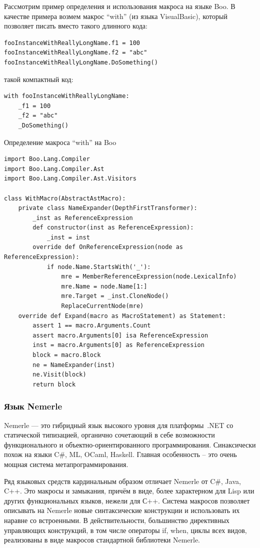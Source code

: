 \documentclass[a4paper,12pt]{article}
\begin{document}
Рассмотрим пример определения и использования макроса на языке Boo. В качестве
примера возмем макрос ``with'' (из языка VisualBasic), который позволяет писать
вместо такого длинного кода:
\begin{verbatim}
fooInstanceWithReallyLongName.f1 = 100
fooInstanceWithReallyLongName.f2 = "abc"
fooInstanceWithReallyLongName.DoSomething()
\end{verbatim}
такой компактный код:
\begin{verbatim}
with fooInstanceWithReallyLongName:
    _f1 = 100
    _f2 = "abc"
    _DoSomething()
\end{verbatim}

\begin{example}
Определение макроса ``with'' на Boo
\end{example}
\begin{verbatim}
import Boo.Lang.Compiler
import Boo.Lang.Compiler.Ast
import Boo.Lang.Compiler.Ast.Visitors

class WithMacro(AbstractAstMacro):
    private class NameExpander(DepthFirstTransformer):
        _inst as ReferenceExpression
        def constructor(inst as ReferenceExpression):
            _inst = inst
        override def OnReferenceExpression(node as ReferenceExpression):
            if node.Name.StartsWith('_'):
                mre = MemberReferenceExpression(node.LexicalInfo)
                mre.Name = node.Name[1:]
                mre.Target = _inst.CloneNode()
                ReplaceCurrentNode(mre)
    override def Expand(macro as MacroStatement) as Statement:
        assert 1 == macro.Arguments.Count
        assert macro.Arguments[0] isa ReferenceExpression
        inst = macro.Arguments[0] as ReferenceExpression
        block = macro.Block
        ne = NameExpander(inst)
        ne.Visit(block)
        return block
\end{verbatim}

\subsubsection{Язык Nemerle}
Nemerle — это гибридный язык высокого уровня для платформы~.NET со статической
типизацией, органично сочетающий в себе возможности функционального и
объектно-ориентированного программирования. Синаксически похож на языки C\#,
ML, OCaml, Haskell. Главная особенность -- это очень мощная система
метапрограммирования.

Ряд языковых средств кардинальным образом отличает Nemerle от C\#, Java, C++.
Это макросы и замыкания, причём в виде, более характерном для Lisp или других
функциональных языков, нежели для С++. Система макросов позволяет описывать на
Nemerle новые синтаксические конструкции и использовать их наравне со
встроенными. В действительности, большинство директивных управляющих
конструкций, в том числе операторы if, when, циклы всех видов, реализованы в
виде макросов стандартной библиотеки Nemerle.
\end{document}

